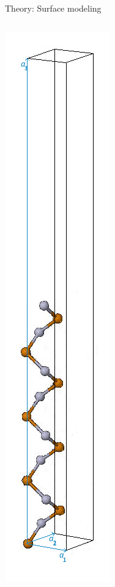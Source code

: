\begin{frame}{Theory: Surface modeling}
\begin{columns}
\begin{column}
			\includegraphics[width=\linewidth]{andere_bilder/hgte_16layer_supercell_2.jpg} 
		\end{column} 
	\end{columns}
\end{frame}

